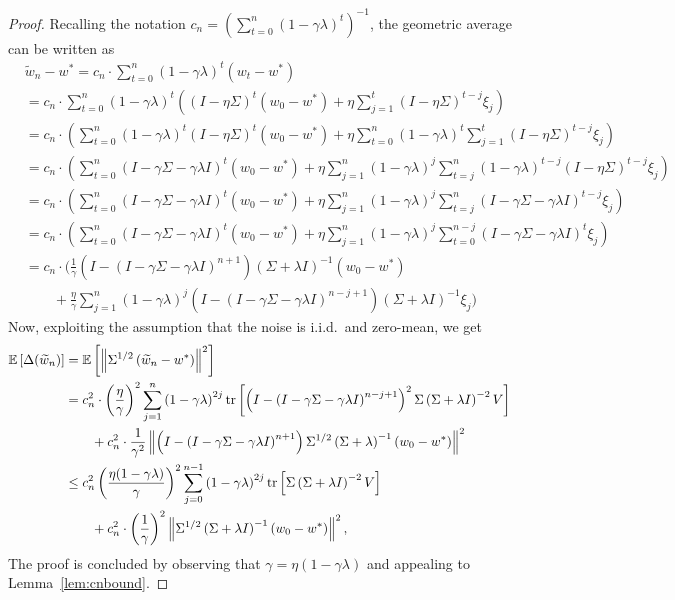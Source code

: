 \documentclass[final,12pt]{colt2018} %
\newcommand{\trace}[1]{\mbox{\normalfont tr}\left[#1\right]}
\newcommand{\EE}[1]{\mathbb{E}\left[#1\right]}
\newcommand{\norm}[1]{\left\|#1\right\|}
\newcommand{\pa}[1]{\left(#1\right)}
\newcommand{\BPA}[1]{\Biggl(#1\Biggr)}
\newcommand{\wt}{\widetilde}
\newcommand{\tw}{\wt{w}}
\begin{document}
\begin{proof}
Recalling the notation $c_n = \pa{\sum_{t=0}^n (1-\gamma\lambda)^t}^{-1}$, the geometric average can be written as
\begin{align*}
 &\tw_n - w^* = c_n \cdot \sum_{t=0}^{n} \pa{1-\gamma\lambda}^t \pa{w_t - w^*}
 \\
 &= c_n \cdot \sum_{t=0}^{n} \pa{1-\gamma\lambda}^t \pa{\pa{I-\eta\Sigma}^t \pa{w_0 - w^*} + \eta \sum_{j=1}^t \pa{I - 
\eta\Sigma}^{t-j} \xi_j}
\\
 &= c_n \cdot \pa{\sum_{t=0}^{n} \pa{1-\gamma\lambda}^t \pa{I-\eta\Sigma}^t \pa{w_0 - w^*} + \eta \sum_{t=0}^{n} 
\pa{1-\gamma\lambda}^t \sum_{j=1}^t \pa{I - \eta\Sigma}^{t-j} \xi_j}
\\
 &= c_n \cdot \pa{\sum_{t=0}^{n} \pa{I-\gamma \Sigma - \gamma\lambda I}^t \pa{w_0 - w^*} + \eta \sum_{j=1}^n 
\pa{1-\gamma\lambda}^j \sum_{t=j}^{n} \pa{1-\gamma\lambda}^{t-j} \pa{I - \eta\Sigma}^{t-j} \xi_j}
\\
 &= c_n \cdot \pa{\sum_{t=0}^{n} \pa{I-\gamma \Sigma - \gamma\lambda I}^t \pa{w_0 - w^*} + \eta \sum_{j=1}^n 
\pa{1-\gamma\lambda}^j \sum_{t=j}^{n} \pa{I - \gamma\Sigma - \gamma \lambda I}^{t-j} \xi_j} 
\\
 &= c_n \cdot \pa{\sum_{t=0}^{n} \pa{I-\gamma \Sigma - \gamma\lambda I}^t \pa{w_0 - w^*} + \eta \sum_{j=1}^n 
\pa{1-\gamma\lambda}^j \sum_{t=0}^{n-j} \pa{I - \gamma\Sigma - \gamma \lambda I}^{t} \xi_j}
\\
 &= c_n \cdot \BPA{\frac{1}{\gamma}\pa{I - \pa{I-\gamma \Sigma - \gamma\lambda I}^{n+1}} \pa{\Sigma + \lambda I}^{-1} \pa{w_0 - 
w^*} \\
 &\qquad + \frac{\eta}{\gamma} \sum_{j=1}^n 
\pa{1-\gamma\lambda}^j \pa{I-\pa{I-\gamma\Sigma - \gamma\lambda I}^{n-j+1}} \pa{\Sigma + \lambda I}^{-1} \xi_j}
\end{align*}
Now, exploiting the assumption that the noise is i.i.d.~and zero-mean, we get
\begin{align*}
 \EE{\Delta(\tw_n)} &= \EE{\norm{\Sigma^{1/2}\pa{\tw_n - w^*}}^2} 
 \\
 &= c_n^2 \cdot \pa{\frac{\eta}{\gamma}}^2 \sum_{j=1}^n \pa{1-\gamma\lambda}^{2j} 
 \trace{\pa{I-\pa{I-\gamma\Sigma - \gamma\lambda I}^{n-j+1}}^2 \Sigma \pa{\Sigma + \lambda I}^{-2} V}
 \\
 &\qquad + c_n^2 \cdot \frac{1}{\gamma^2}\norm{\pa{I - \pa{I-\gamma \Sigma - \gamma\lambda I}^{n+1}} \Sigma^{1/2}\pa{\Sigma + 
\lambda}^{-1} 
\pa{w_0 - w^*}}^2
 \\
 &\le c_n^2 \pa{\frac{\eta (1-\gamma\lambda)}{\gamma}}^2 \sum_{j=0}^{n-1} \pa{1-\gamma\lambda}^{2j} \trace{\Sigma \pa{\Sigma + \lambda 
I}^{-2} V}
 \\
 &\qquad + c_n^2 \cdot \pa{\frac{1}{\gamma}}^2 \norm{\Sigma^{1/2}\pa{\Sigma + \lambda I}^{-1} \pa{w_0 - w^*}}^2,
\end{align*}
The proof is concluded by observing that $\gamma = \eta (1-\gamma\lambda)$ and appealing to Lemma~\ref{lem:cnbound}.
\end{proof}
\end{document}

